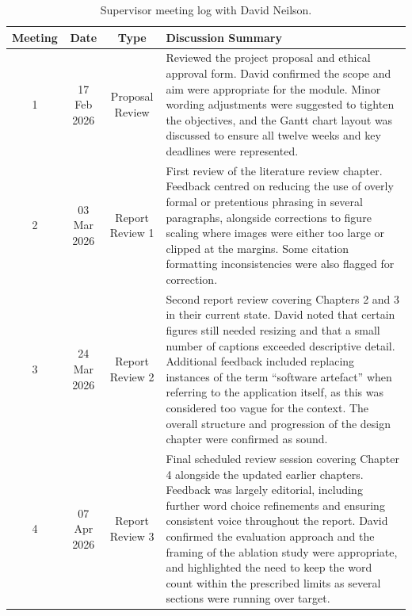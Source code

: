 \documentclass[12pt, a4paper, oneside]{report}
\begin{document}
\begin{appendices}
\begin{table}[ht]
\centering
\caption{Supervisor meeting log with David Neilson.}
\label{tab:supervisor-meetings}
\renewcommand{\arraystretch}{1.4}
\small
\begin{tabularx}{\textwidth}{|c|c|c|X|}
\hline
\rowcolor{headerblue}
\textcolor{headertext}{\textbf{Meeting}} &
\textcolor{headertext}{\textbf{Date}} &
\textcolor{headertext}{\textbf{Type}} &
\textcolor{headertext}{\textbf{Discussion Summary}} \\
\hline
\rowcolor{rowlight}
1 & 17 Feb 2026 & Proposal Review &
Reviewed the project proposal and ethical approval form. David confirmed the scope and aim were appropriate for the module. Minor wording adjustments were suggested to tighten the objectives, and the Gantt chart layout was discussed to ensure all twelve weeks and key deadlines were represented. \\
\hline
\rowcolor{rowwhite}
2 & 03 Mar 2026 & Report Review 1 &
First review of the literature review chapter. Feedback centred on reducing the use of overly formal or pretentious phrasing in several paragraphs, alongside corrections to figure scaling where images were either too large or clipped at the margins. Some citation formatting inconsistencies were also flagged for correction. \\
\hline
\rowcolor{rowlight}
3 & 24 Mar 2026 & Report Review 2 &
Second report review covering Chapters 2 and 3 in their current state. David noted that certain figures still needed resizing and that a small number of captions exceeded descriptive detail. Additional feedback included replacing instances of the term ``software artefact'' when referring to the application itself, as this was considered too vague for the context. The overall structure and progression of the design chapter were confirmed as sound. \\
\hline
\rowcolor{rowwhite}
4 & 07 Apr 2026 & Report Review 3 &
Final scheduled review session covering Chapter 4 alongside the updated earlier chapters. Feedback was largely editorial, including further word choice refinements and ensuring consistent voice throughout the report. David confirmed the evaluation approach and the framing of the ablation study were appropriate, and highlighted the need to keep the word count within the prescribed limits as several sections were running over target. \\
\hline
\end{tabularx}
\end{table}


\end{appendices}
\end{document}
